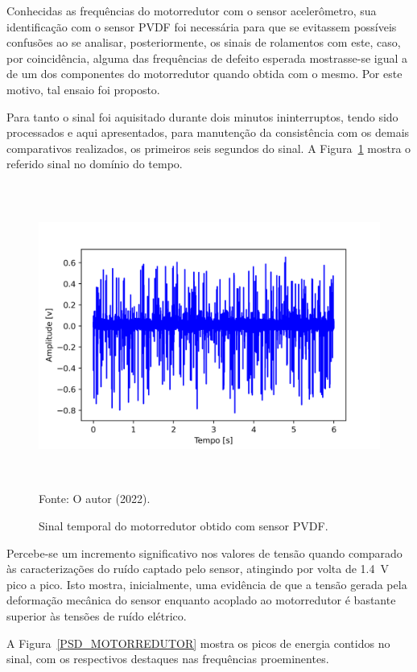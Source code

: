 \documentclass[
	12pt,				
	oneside,			
	a4paper,			
	english,			
	brazil,	
	sumario=abnt-6027-2012		
	]{abntex2ppgsi}
\begin{document}
{{{{{{{Conhecidas as frequências do  motorredutor com o sensor acelerômetro, sua identificação com o sensor PVDF foi necessária para que se evitassem possíveis confusões ao se analisar, posteriormente, os sinais de rolamentos com este, caso, por coincidência, alguma das frequências de defeito esperada mostrasse-se igual a de um dos componentes do motorredutor quando obtida com o mesmo. Por este motivo, tal ensaio foi proposto. 

Para tanto o sinal foi aquisitado durante dois minutos ininterruptos, tendo sido processados e aqui apresentados, para manutenção da consistência com os demais comparativos realizados, os primeiros seis segundos do sinal. A Figura~\ref{motorredutor} mostra o referido sinal no domínio do tempo.

\begin{figure}[H]
\centering
\caption {Sinal temporal do motorredutor obtido com sensor PVDF.}
\includegraphics[width=\textwidth,height=100mm,keepaspectratio]{aquisicao_04_motorredutor_10_03_2022_09h46min_ajustado_6s} \\
Fonte: O autor (2022).
\label{motorredutor}
\end{figure} 

Percebe-se um incremento significativo nos valores de tensão quando comparado às caracterizações do ruído captado pelo sensor, atingindo por volta de {\SI{1,4}{\volt}} pico a pico. Isto mostra, inicialmente, uma evidência de que a tensão gerada pela deformação mecânica do sensor enquanto acoplado ao motorredutor é bastante superior às tensões de ruído elétrico. 

A Figura~\ref{PSD_MOTORREDUTOR} mostra os picos de energia contidos no sinal, com os respectivos destaques nas frequências proeminentes.

}}}}}}}
\end{document}
